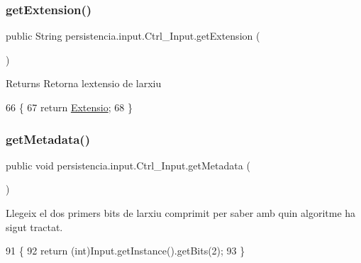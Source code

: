 \subsubsection{\texorpdfstring{get\+Extension()}{getExtension()}}
{\footnotesize\ttfamily public String persistencia.\+input.\+Ctrl\+\_\+\+Input.\+get\+Extension (\begin{DoxyParamCaption}{ }\end{DoxyParamCaption})\hspace{0.3cm}{\ttfamily [inline]}}

\begin{DoxyReturn}{Returns}
Retorna l\textquotesingle{}extensio de l\textquotesingle{}arxiu 
\end{DoxyReturn}

\begin{DoxyCode}
66                                  \{
67         \textcolor{keywordflow}{return} \hyperlink{classpersistencia_1_1input_1_1Ctrl__Input_a6041b56aa31f01f75d02382f98e259e5}{Extensio};
68     \}
\end{DoxyCode}
\mbox{\label{classpersistencia_1_1input_1_1Ctrl__Input_a46e05fce164a6803820c02565c1769c8}} 
\subsubsection{\texorpdfstring{get\+Metadata()}{getMetadata()}}
{\footnotesize\ttfamily public void persistencia.\+input.\+Ctrl\+\_\+\+Input.\+get\+Metadata (\begin{DoxyParamCaption}{ }\end{DoxyParamCaption})\hspace{0.3cm}{\ttfamily [inline]}}



Llegeix el dos primers bits de l\textquotesingle{}arxiu comprimit per saber amb quin algoritme ha sigut tractat. 


\begin{DoxyCode}
91                              \{
92         \textcolor{keywordflow}{return} (\textcolor{keywordtype}{int})Input.getInstance().getBits(2);
93     \}
\end{DoxyCode}
\mbox{\label{classpersistencia_1_1input_1_1Ctrl__Input_a0b62b5bc05ac4a7fd919a49b201eb4fd}} 
